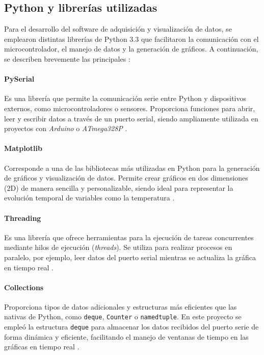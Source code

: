 \subsection{Python y librerías utilizadas}

Para el desarrollo del software de adquisición y visualización de datos, se emplearon distintas librerías de Python 3.3 que facilitaron la comunicación con el microcontrolador, el manejo de datos y la generación de gráficos.  
A continuación, se describen brevemente las principales \cite{python_docs, pyserial_docs, matplotlib_docs}:

\paragraph*{PySerial}
Es una librería que permite la comunicación serie entre Python y dispositivos externos, como microcontroladores o sensores.  
Proporciona funciones para abrir, leer y escribir datos a través de un puerto serial, siendo ampliamente utilizada en proyectos con \textit{Arduino} o \textit{ATmega328P} \cite{pyserial_docs}.

\paragraph*{Matplotlib}
Corresponde a una de las bibliotecas más utilizadas en Python para la generación de gráficos y visualización de datos.  
Permite crear gráficos en dos dimensiones (2D) de manera sencilla y personalizable, siendo ideal para representar la evolución temporal de variables como la temperatura \cite{matplotlib_docs}.

\paragraph*{Threading}
Es una librería que ofrece herramientas para la ejecución de tareas concurrentes mediante hilos de ejecución (\textit{threads}).  
Se utiliza para realizar procesos en paralelo, por ejemplo, leer datos del puerto serial mientras se actualiza la gráfica en tiempo real \cite{python_docs}.

\paragraph*{Collections}
Proporciona tipos de datos adicionales y estructuras más eficientes que las nativas de Python, como \texttt{deque}, \texttt{Counter} o \texttt{namedtuple}.  
En este proyecto se empleó la estructura \texttt{deque} para almacenar los datos recibidos del puerto serie de forma dinámica y eficiente, facilitando el manejo de ventanas de tiempo en las gráficas en tiempo real \cite{python_docs}.


